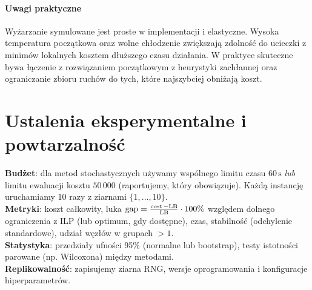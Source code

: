 \paragraph{Uwagi praktyczne}
Wyżarzanie symulowane jest proste w implementacji i elastyczne. Wysoka temperatura początkowa oraz wolne chłodzenie zwiększają zdolność do ucieczki z minimów lokalnych kosztem dłuższego czasu działania. W praktyce skuteczne bywa łączenie z rozwiązaniem początkowym z heurystyki zachłannej oraz ograniczanie zbioru ruchów do tych, które najszybciej obniżają koszt.

\section{Ustalenia eksperymentalne i powtarzalność}
\textbf{Budżet}: dla metod stochastycznych używamy wspólnego limitu czasu $60\,\mathrm{s}$ \emph{lub} limitu ewaluacji kosztu $50\,000$ (raportujemy, który obowiązuje). Każdą instancję uruchamiamy 10 razy z ziarnami $\{1,\dots,10\}$.\\
\textbf{Metryki}: koszt całkowity, luka $\mathrm{gap}=\tfrac{\operatorname{cost}-\mathrm{LB}}{\mathrm{LB}}\cdot 100\%$ względem dolnego ograniczenia z ILP (lub optimum, gdy dostępne), czas, stabilność (odchylenie standardowe), udział węzłów w grupach $>1$.\\
\textbf{Statystyka}: przedziały ufności 95\% (normalne lub bootstrap), testy istotności parowane (np. Wilcoxona) między metodami.\\
\textbf{Replikowalność}: zapisujemy ziarna RNG, wersje oprogramowania i konfiguracje hiperparametrów.
